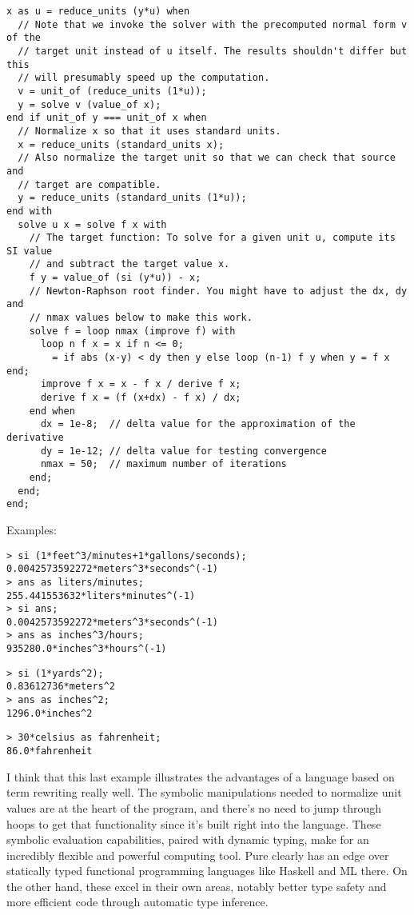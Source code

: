 \documentclass[a4paper,12pt]{article}
\begin{document}
\begin{lstlisting}
x as u = reduce_units (y*u) when
  // Note that we invoke the solver with the precomputed normal form v of the
  // target unit instead of u itself. The results shouldn't differ but this
  // will presumably speed up the computation.
  v = unit_of (reduce_units (1*u));
  y = solve v (value_of x);
end if unit_of y === unit_of x when
  // Normalize x so that it uses standard units.
  x = reduce_units (standard_units x);
  // Also normalize the target unit so that we can check that source and
  // target are compatible.
  y = reduce_units (standard_units (1*u));
end with
  solve u x = solve f x with
    // The target function: To solve for a given unit u, compute its SI value
    // and subtract the target value x.
    f y = value_of (si (y*u)) - x;
    // Newton-Raphson root finder. You might have to adjust the dx, dy and
    // nmax values below to make this work.
    solve f = loop nmax (improve f) with
      loop n f x = x if n <= 0;
        = if abs (x-y) < dy then y else loop (n-1) f y when y = f x end;
      improve f x = x - f x / derive f x;
      derive f x = (f (x+dx) - f x) / dx;
    end when
      dx = 1e-8;  // delta value for the approximation of the derivative
      dy = 1e-12; // delta value for testing convergence
      nmax = 50;  // maximum number of iterations
    end;
  end;
end;
\end{lstlisting}

\noindent Examples:

\begin{lstlisting}
> si (1*feet^3/minutes+1*gallons/seconds);
0.0042573592272*meters^3*seconds^(-1)
> ans as liters/minutes;
255.441553632*liters*minutes^(-1)
> si ans;
0.0042573592272*meters^3*seconds^(-1)
> ans as inches^3/hours;
935280.0*inches^3*hours^(-1)
\end{lstlisting}

\pagebreak[4]

\begin{lstlisting}
> si (1*yards^2);
0.83612736*meters^2
> ans as inches^2;
1296.0*inches^2
\end{lstlisting}

\begin{lstlisting}
> 30*celsius as fahrenheit;
86.0*fahrenheit
\end{lstlisting}

I think that this last example illustrates the advantages of a language
based on term rewriting really well. The symbolic manipulations needed to normalize unit values are at the heart of the program, and there's no need to jump through hoops to get that functionality since it's built right into the language. These symbolic evaluation capabilities, paired with dynamic typing, make for an incredibly flexible and powerful computing tool. Pure clearly has an edge over statically typed functional programming languages like Haskell and ML there. On the other hand, these excel in their own areas, notably better type safety and more efficient code through automatic type inference.
\end{document}
